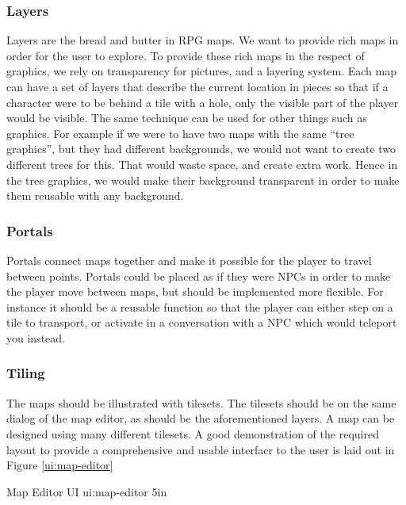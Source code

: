 \subsubsection{Layers}

Layers are the bread and butter in RPG maps. We want to provide rich maps in
order for the user to explore. To provide these rich maps in the respect of
graphics, we rely on transparency for pictures, and a layering system. Each
map can have a set of layers that describe the current location in pieces so
that if a character were to be behind a tile with a hole, only the visible part
of the player would be visible. The same technique can be used for other things
such as graphics. For example if we were to have two maps with the same ``tree
graphics'', but they had different backgrounds, we would not want to create two
different trees for this. That would waste space, and create extra work. Hence
in the tree graphics, we would make their background transparent in order to
make them reusable with any background.

\subsubsection{Portals}

Portals connect maps together and make it possible for the player to travel
between points. Portals could be placed as if they were NPCs in order to make
the player move between maps, but should be implemented more flexible. For
instance it should be a reusable function so that the player can either step
on a tile to transport, or activate in a conversation with a NPC which would
teleport you instead.

\subsubsection{Tiling}

The maps should be illustrated with tilesets. The tilesets should be on the
same dialog of the map editor, as should be the aforementioned layers. A map
can be designed using many different tilesets. A good demonstration of the
required layout to provide a comprehensive and usable interfacr to the user
is laid out in Figure \ref{ui:map-editor}


%
       {Map Editor UI}%
       {ui:map-editor}%
       {5in}


